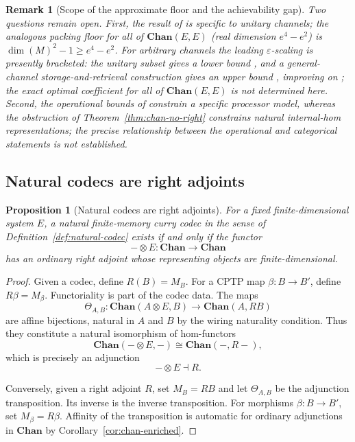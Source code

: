\documentclass[11pt]{article}
\newtheorem{proposition}[theorem]{Proposition}
\newtheorem{remark}[theorem]{Remark}
\begin{document}
\begin{remark}[Scope of the approximate floor and the achievability gap]
Two questions remain open. First, the result of
\cite{YangRennerChiribella2020} is specific to unitary channels; the analogous
packing floor for all of $\mathbf{Chan}(E,E)$ (real dimension $e^4-e^2$) is
$\dim(M)^2-1\ge e^4-e^2$. For arbitrary channels the leading $\varepsilon$-scaling
is presently bracketed: the unitary subset gives a lower bound
\cite{YangRennerChiribella2020}, and a general-channel storage-and-retrieval
construction gives an upper bound \cite{YoshidaMiyazakiMurao2026}, improving on
\cite{GschwendtnerWinter2021}; the exact optimal coefficient for all of
$\mathbf{Chan}(E,E)$ is not determined here. Second, the operational
bounds of \cite{YangRennerChiribella2020, KubickiPalazuelosPerezGarcia2019}
constrain a specific processor model, whereas the obstruction of
Theorem~\ref{thm:chan-no-right} constrains natural internal-hom
representations; the precise relationship between the operational and
categorical statements is not established.
\end{remark}

\subsection{Natural codecs are right adjoints}

\begin{proposition}[Natural codecs are right adjoints]
\label{prop:codec-adjoint}
For a fixed finite-dimensional system $E$, a natural finite-memory curry
codec in the sense of Definition~\ref{def:natural-codec} exists if and only
if the functor
\[
-\otimes E:\mathbf{Chan}\to\mathbf{Chan}
\]
has an ordinary right adjoint whose representing objects are
finite-dimensional.
\end{proposition}

\begin{proof}
Given a codec, define $R(B)=M_B$. For a CPTP map $\beta:B\to B'$, define
$R\beta=M_\beta$. Functoriality is part of the codec data. The maps
\[
\Theta_{A,B}:
\mathbf{Chan}(A\otimes E,B)
\longrightarrow
\mathbf{Chan}(A,RB)
\]
are affine bijections, natural in $A$ and $B$ by the wiring naturality
condition. Thus they constitute a natural isomorphism of hom-functors
\[
\mathbf{Chan}(-\otimes E,-)
\cong
\mathbf{Chan}(-,R-),
\]
which is precisely an adjunction
\[
-\otimes E\dashv R.
\]

Conversely, given a right adjoint $R$, set $M_B=RB$ and let $\Theta_{A,B}$
be the adjunction transposition. Its inverse is the inverse transposition.
For morphisms $\beta:B\to B'$, set $M_\beta=R\beta$. Affinity of the
transposition is automatic for ordinary adjunctions in $\mathbf{Chan}$ by
Corollary~\ref{cor:chan-enriched}.
\end{proof}
\end{document}
